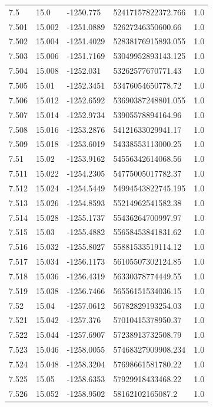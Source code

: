 \begin{tabular}{lllll}
7.5 & 15.0 & -1250.775 & 52417157822372.766 & 1.0 \\
7.501 & 15.002 & -1251.0889 & 52627246350600.66 & 1.0 \\
7.502 & 15.004 & -1251.4029 & 52838176915893.055 & 1.0 \\
7.503 & 15.006 & -1251.7169 & 53049952893143.125 & 1.0 \\
7.504 & 15.008 & -1252.031 & 53262577670771.43 & 1.0 \\
7.505 & 15.01 & -1252.3451 & 53476054650778.72 & 1.0 \\
7.506 & 15.012 & -1252.6592 & 53690387248801.055 & 1.0 \\
7.507 & 15.014 & -1252.9734 & 53905578894164.96 & 1.0 \\
7.508 & 15.016 & -1253.2876 & 54121633029941.17 & 1.0 \\
7.509 & 15.018 & -1253.6019 & 54338553113000.25 & 1.0 \\
7.51 & 15.02 & -1253.9162 & 54556342614068.56 & 1.0 \\
7.511 & 15.022 & -1254.2305 & 54775005017782.37 & 1.0 \\
7.512 & 15.024 & -1254.5449 & 54994543822745.195 & 1.0 \\
7.513 & 15.026 & -1254.8593 & 55214962541582.38 & 1.0 \\
7.514 & 15.028 & -1255.1737 & 55436264700997.97 & 1.0 \\
7.515 & 15.03 & -1255.4882 & 55658453841831.62 & 1.0 \\
7.516 & 15.032 & -1255.8027 & 55881533519114.12 & 1.0 \\
7.517 & 15.034 & -1256.1173 & 56105507302124.85 & 1.0 \\
7.518 & 15.036 & -1256.4319 & 56330378774449.55 & 1.0 \\
7.519 & 15.038 & -1256.7466 & 56556151534036.15 & 1.0 \\
7.52 & 15.04 & -1257.0612 & 56782829193254.03 & 1.0 \\
7.521 & 15.042 & -1257.376 & 57010415378950.37 & 1.0 \\
7.522 & 15.044 & -1257.6907 & 57238913732508.79 & 1.0 \\
7.523 & 15.046 & -1258.0055 & 57468327909908.234 & 1.0 \\
7.524 & 15.048 & -1258.3204 & 57698661581780.22 & 1.0 \\
7.525 & 15.05 & -1258.6353 & 57929918433468.22 & 1.0 \\
7.526 & 15.052 & -1258.9502 & 58162102165087.2 & 1.0 \\

\end{tabular}
